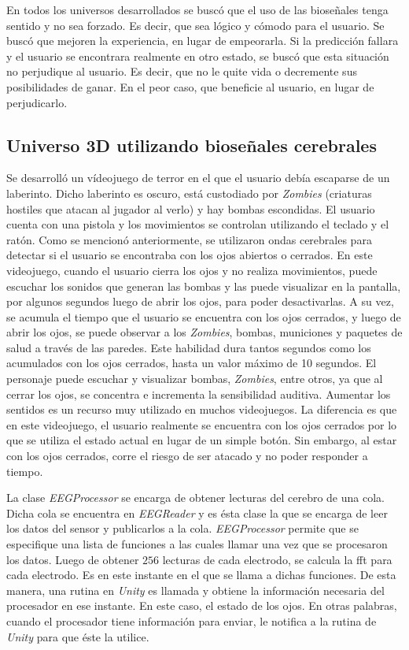 En todos los universos desarrollados se buscó que el uso de las bioseñales tenga sentido y no sea forzado. Es decir, que sea lógico y cómodo para el usuario. Se buscó que mejoren la experiencia, en lugar de empeorarla. Si la predicción fallara y el usuario se encontrara realmente en otro estado, se buscó que esta situación no perjudique al usuario. Es decir, que no le quite vida o decremente sus posibilidades de ganar. En el peor caso, que beneficie al usuario, en lugar de perjudicarlo.

\subsection{Universo 3D utilizando bioseñales cerebrales}

Se desarrolló un vídeojuego de terror en el que el usuario debía escaparse de un laberinto. Dicho laberinto es oscuro, está custodiado por \emph{Zombies} (criaturas hostiles que atacan al jugador al verlo) y hay bombas escondidas. El usuario cuenta con una pistola y los movimientos se controlan utilizando el teclado y el ratón. Como se mencionó anteriormente, se utilizaron ondas cerebrales para detectar si el usuario se encontraba con los ojos abiertos o cerrados. En este videojuego, cuando el usuario cierra los ojos y no realiza movimientos, puede escuchar los sonidos que generan las bombas y las puede visualizar en la pantalla, por algunos segundos luego de abrir los ojos, para poder desactivarlas. A su vez, se acumula el tiempo que el usuario se encuentra con los ojos cerrados, y luego de abrir los ojos, se puede observar a los \emph{Zombies}, bombas, municiones y paquetes de salud  a través de las paredes. Este habilidad dura tantos segundos como los acumulados con los ojos cerrados, hasta un valor máximo de 10 segundos. El personaje puede escuchar y visualizar bombas, \emph{Zombies}, entre otros, ya que al cerrar los ojos, se concentra e incrementa la sensibilidad auditiva. Aumentar los sentidos es un recurso muy utilizado en muchos videojuegos. La diferencia es que en este videojuego, el usuario realmente se encuentra con los ojos cerrados por lo que se utiliza el estado actual en lugar de un simple botón. Sin embargo, al estar con los ojos cerrados, corre el riesgo de ser atacado y no poder responder a tiempo.

La clase \emph{EEGProcessor} se encarga de obtener lecturas del cerebro de una cola. Dicha cola se encuentra en \emph{EEGReader} y es ésta clase la que se encarga de leer los datos del sensor y publicarlos a la cola. \emph{EEGProcessor} permite que se especifique una lista de funciones a las cuales llamar una vez que se procesaron los datos. Luego de obtener $256$ lecturas de cada electrodo, se calcula la \acrshort{fft} para cada electrodo. Es en este instante en el que se llama a dichas funciones. De esta manera, una rutina en \emph{Unity} es llamada y obtiene la información necesaria del procesador en ese instante. En este caso, el estado de los ojos. En otras palabras, cuando el procesador tiene información para enviar, le notifica a la rutina de \emph{Unity} para que éste la utilice.

